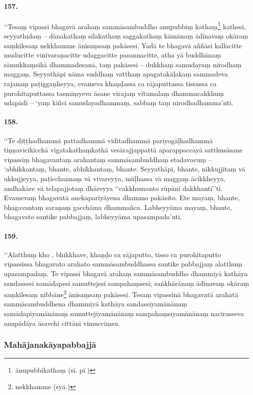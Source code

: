 \paragraph{157.} ‘‘Tesaṃ vipassī bhagavā arahaṃ sammāsambuddho anupubbiṃ kathaṃ\footnote{ānupubbikathaṃ (sī. pī.)} kathesi, seyyathidaṃ – dānakathaṃ sīlakathaṃ saggakathaṃ kāmānaṃ ādīnavaṃ okāraṃ saṃkilesaṃ nekkhamme ānisaṃsaṃ pakāsesi. Yadā te bhagavā aññāsi kallacitte muducitte vinīvaraṇacitte udaggacitte pasannacitte, atha yā buddhānaṃ sāmukkaṃsikā dhammadesanā, taṃ pakāsesi – dukkhaṃ samudayaṃ nirodhaṃ maggaṃ. Seyyathāpi nāma suddhaṃ vatthaṃ apagatakāḷakaṃ sammadeva rajanaṃ paṭiggaṇheyya, evameva khaṇḍassa ca rājaputtassa tissassa ca purohitaputtassa tasmiṃyeva āsane virajaṃ vītamalaṃ dhammacakkhuṃ udapādi – ‘yaṃ kiñci samudayadhammaṃ, sabbaṃ taṃ nirodhadhamma’nti.

\paragraph{158.} ‘‘Te diṭṭhadhammā pattadhammā viditadhammā pariyogāḷhadhammā tiṇṇavicikicchā vigatakathaṃkathā vesārajjappattā aparappaccayā satthusāsane vipassiṃ bhagavantaṃ arahantaṃ sammāsambuddhaṃ etadavocuṃ – ‘abhikkantaṃ, bhante, abhikkantaṃ, bhante. Seyyathāpi, bhante, nikkujjitaṃ vā ukkujjeyya, paṭicchannaṃ vā vivareyya, mūḷhassa vā maggaṃ ācikkheyya, andhakāre vā telapajjotaṃ dhāreyya ‘‘cakkhumanto rūpāni dakkhantī’’ti. Evamevaṃ bhagavatā anekapariyāyena dhammo pakāsito. Ete mayaṃ, bhante, bhagavantaṃ saraṇaṃ gacchāma dhammañca. Labheyyāma mayaṃ, bhante, bhagavato santike pabbajjaṃ, labheyyāma upasampada’nti.

\paragraph{159.} ‘‘Alatthuṃ kho , bhikkhave, khaṇḍo ca rājaputto, tisso ca purohitaputto vipassissa bhagavato arahato sammāsambuddhassa santike pabbajjaṃ alatthuṃ upasampadaṃ. Te vipassī bhagavā arahaṃ sammāsambuddho dhammiyā kathāya sandassesi samādapesi samuttejesi sampahaṃsesi; saṅkhārānaṃ ādīnavaṃ okāraṃ saṃkilesaṃ nibbāne\footnote{nekkhamme (syā.)} ānisaṃsaṃ pakāsesi. Tesaṃ vipassinā bhagavatā arahatā sammāsambuddhena dhammiyā kathāya sandassiyamānānaṃ samādapiyamānānaṃ samuttejiyamānānaṃ sampahaṃsiyamānānaṃ nacirasseva anupādāya āsavehi cittāni vimucciṃsu.

\subsubsection{Mahājanakāyapabbajjā}

